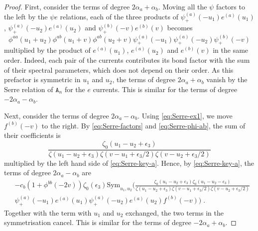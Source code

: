 \documentclass[11pt]{article}
\numberwithin{equation}{section}
\numberwithin{figure}{section}
\numberwithin{table}{section}
\begin{document}
\begin{proof}
	First, consider the terms of degree $2\alpha_a+\alpha_b$. Moving all the $\psi$ factors to the left by the $\psi e$ relations, each of the three products of $\psi^{(a)}_+(-u_1)e^{(a)}(u_1)$, $\psi^{(a)}_+(-u_2)e^{(a)}(u_2)$ and $\psi^{(b)}_+(-v)e^{(b)}(v)$ becomes
	\begin{equation}
		\phi^{aa}(u_1+u_2)\phi^{ab}(u_1+v)\phi^{ab}(u_2+v)\psi^{(a)}_+(-u_1)\psi^{(a)}_+(-u_2)\psi^{(b)}_+(-v)
	\end{equation}
	multiplied by the product of $e^{(a)}(u_1)$, $e^{(a)}(u_2)$ and $e^{(b)}(v)$ in the same order. Indeed, each pair of the currents contributes its bond factor with the sum of their spectral parameters, which does not depend on their order. As this prefactor is symmetric in $u_1$ and $u_2$, the terms of degree $2\alpha_a+\alpha_b$ vanish by the Serre relation of $\mathtt{A}_n$ for the $e$ currents. This is similar for the terms of degree $-2\alpha_a-\alpha_b$.

    Next, consider the terms of degree $2\alpha_a-\alpha_b$. Using \eqref{eq:Serre-ex1}, we move $f^{(b)}(-v)$ to the right. By \eqref{eq:Serre-factors} and \eqref{eq:Serre-phi-ab}, the sum of their coefficients is
	\begin{equation}
		\frac{\zeta_0(u_1-u_2+\epsilon_3)}{\zeta(u_1-u_2+\epsilon_3)\zeta(v-u_1+\epsilon_3/2)\zeta(v-u_2+\epsilon_3/2)}
	\end{equation}
	multiplied by the left hand side of \eqref{eq:Serre-key-a}. Hence, by \eqref{eq:Serre-key-a}, the terms of degree $2\alpha_a-\alpha_b$ are
	\begin{align}
		&-c_b\left(1+\phi^{bb}(-2v)\right)\zeta_0(\epsilon_3)\mathrm{Sym}_{u_1,u_2}\bigg(\frac{\zeta_0(u_1-u_2+\epsilon_3)\zeta_0(u_1-u_2-\epsilon_3)}{\zeta(u_1-u_2+\epsilon_3)\zeta(v-u_1+\epsilon_3/2)\zeta(v-u_2+\epsilon_3/2)}\nonumber\\
		&\psi^{(a)}_+(-u_1)e^{(a)}(u_1)\psi^{(a)}_+(-u_2)e^{(a)}(u_2)f^{(b)}(-v)\bigg)\;.
	\end{align}
	Together with the term with $u_1$ and $u_2$ exchanged, the two terms in the symmetrisation cancel. This is similar for the terms of degree $-2\alpha_a+\alpha_b$.


\end{proof}
\end{document}
